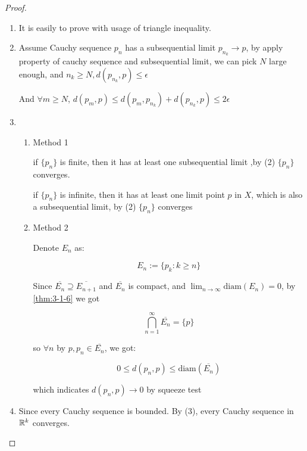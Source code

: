 \begin{proof}
    \begin{enumerate}
        \item It is easily to prove with usage of triangle inequality.

        \item Assume Cauchy sequence $p_n$ has a subsequential limit $p_{n_k} \to p$,
        by apply property of cauchy sequence and subsequential limit, we can pick $N$ large enough, and $n_k \ge N, d(p_{n_k}, p) \le \epsilon$ 
        
        And $\forall m \ge N$, $d(p_m, p) \le d(p_m , p_{n_k}) + d(p_{n_k}, p) \le 2\epsilon$

        \item 
        
        \begin{enumerate}
            \item Method 1


        if $\{ p_n \}$ is finite, then it has at least one subsequential limit ,by (2) $\{p_n\}$ converges.

        if $\{ p_n \}$ is infinite, then it has at least one limit point $p$ in $X$, which is also a subsequential limit,
        by (2) $\{ p_n\}$ converges


            \item Method 2

            Denote $E_n$ as:

            \[
                E_n := \{ p_k : k \ge n \}
            \]

            Since $\overline{E_n} \supseteq \overline{E_{n+1}}$ and $\overline{E_n}$ is compact, and 
            $\lim_{n \to \infty} \mathrm{diam}(E_n) = 0$, by \autoref{thm:3-1-6} we got

            \[
                \bigcap_{n=1}^{\infty}\overline{E_n} = \{ p \}
            \]

            so $\forall n$ by $p, p_n \in \overline{E_n}$, we got:

            \[
                0 \le d(p_n, p) \le \mathrm{diam}(\overline{E_n}) 
            \]

            which indicates $d(p_n, p) \to 0$ by squeeze test
        \end{enumerate}

        \item Since every Cauchy sequence is bounded. By (3), every Cauchy sequence in $\mathbb{R}^k$ converges.
    \end{enumerate}
\end{proof}

